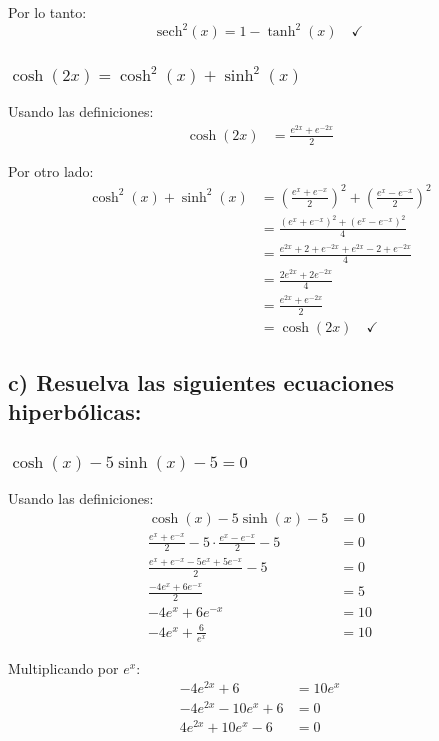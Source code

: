 \documentclass{article}
\begin{document}
Por lo tanto:
$$\text{sech}^2(x) = 1 - \tanh^2(x) \quad \checkmark$$

\subsubsection*{$\cosh(2x) = \cosh^2(x) + \sinh^2(x)$}

Usando las definiciones:
\begin{align*}
\cosh(2x) &= \frac{e^{2x} + e^{-2x}}{2}
\end{align*}

Por otro lado:
\begin{align*}
\cosh^2(x) + \sinh^2(x) &= \left(\frac{e^x + e^{-x}}{2}\right)^2 + \left(\frac{e^x - e^{-x}}{2}\right)^2 \\
                        &= \frac{(e^x + e^{-x})^2 + (e^x - e^{-x})^2}{4} \\
                        &= \frac{e^{2x} + 2 + e^{-2x} + e^{2x} - 2 + e^{-2x}}{4} \\
                        &= \frac{2e^{2x} + 2e^{-2x}}{4} \\
                        &= \frac{e^{2x} + e^{-2x}}{2} \\
                        &= \cosh(2x) \quad \checkmark
\end{align*}

\subsection*{c) Resuelva las siguientes ecuaciones hiperbólicas:}

\subsubsection*{$\cosh(x) - 5\sinh(x) - 5 = 0$}

Usando las definiciones:
\begin{align*}
\cosh(x) - 5\sinh(x) - 5 &= 0 \\
\frac{e^x + e^{-x}}{2} - 5 \cdot \frac{e^x - e^{-x}}{2} - 5 &= 0 \\
\frac{e^x + e^{-x} - 5e^x + 5e^{-x}}{2} - 5 &= 0 \\
\frac{-4e^x + 6e^{-x}}{2} &= 5 \\
-4e^x + 6e^{-x} &= 10 \\
-4e^x + \frac{6}{e^x} &= 10
\end{align*}

Multiplicando por $e^x$:
\begin{align*}
-4e^{2x} + 6 &= 10e^x \\
-4e^{2x} - 10e^x + 6 &= 0 \\
4e^{2x} + 10e^x - 6 &= 0
\end{align*}
\end{document}
